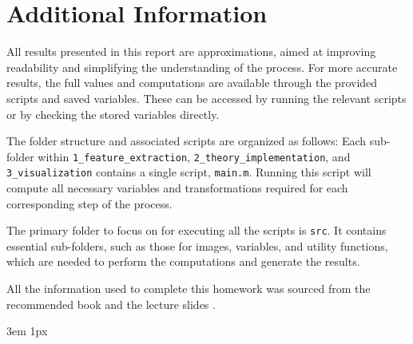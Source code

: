 \documentclass{Academic}
\begin{document}
\section{Additional Information}
All results presented in this report are approximations, aimed at improving readability and simplifying the understanding of the process. 
For more accurate results, the full values and computations are available through the provided scripts and saved variables.
These can be accessed by running the relevant scripts or by checking the stored variables directly. 

\noindent The folder structure and associated scripts are organized as follows:
\renewcommand*\DTstylecomment{\rmfamily\color{blue}\textsc}
Each sub-folder within \texttt{1\_feature\_extraction}, \texttt{2\_theory\_implementation}, and \\ \texttt{3\_visualization} contains a single script, \texttt{main.m}.
Running this script will compute all necessary variables and transformations required for each corresponding step of the process.

The primary folder to focus on for executing all the scripts is \texttt{src}. 
It contains essential sub-folders, such as those for images, variables, and utility functions, which are needed to perform the computations and generate the results.

All the information used to complete this homework was sourced from the recommended book \cite{book} and the lecture slides \cite{slides}.

\singlespacing
\emergencystretch 3em
\hfuzz 1px
\printbibliography[heading=bibnumbered]
\end{document}
